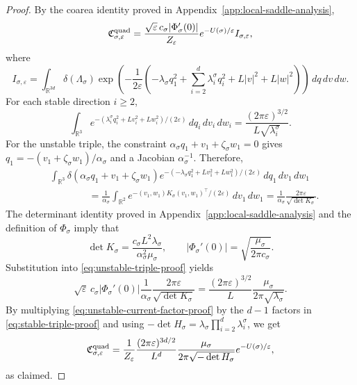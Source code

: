 \documentclass[11pt]{article}
\numberwithin{equation}{section}
\theoremstyle{plain}
\theoremstyle{definition}
\theoremstyle{remark}
\newcommand{\R}{\mathbb R}
\newcommand{\eps}{\varepsilon}
\begin{document}
\begin{proof}
By the coarea identity proved in Appendix~\ref{app:local-saddle-analysis},
\begin{equation}
\label{eq:quadratic-current-proof-factorization}
\mathfrak C_{\sigma,\eps}^{\rm quad}
=\frac{\sqrt\eps\,c_\sigma|\Phi_\sigma'(0)|}{Z_\eps}
e^{-U(\sigma)/\eps}I_{\sigma,\eps},
\end{equation}
where
\[
I_{\sigma,\eps}
=\int_{\R^{3d}}\delta(\Lambda_\sigma)
\exp\!\left(-\frac1{2\eps}\left(
-\lambda_\sigma q_1^2+\sum_{i=2}^d\lambda_i^\sigma q_i^2
+L|v|^2+L|w|^2\right)\right)\,dq\,dv\,dw.
\]
For each stable direction $i\ge2$,
\begin{equation}
\label{eq:stable-triple-proof}
\int_{\R^3}
e^{-(\lambda_i^\sigma q_i^2+Lv_i^2+Lw_i^2)/(2\eps)}
\,dq_i\,dv_i\,dw_i
=\frac{(2\pi\eps)^{3/2}}{L\sqrt{\lambda_i^\sigma}}.
\end{equation}
For the unstable triple, the constraint
$\alpha_\sigma q_1+v_1+\zeta_\sigma w_1=0$ gives
$q_1=-(v_1+\zeta_\sigma w_1)/\alpha_\sigma$ and a Jacobian
$\alpha_\sigma^{-1}$.  Therefore,
\begin{equation}
\label{eq:unstable-triple-proof}
\begin{aligned}
&\int_{\R^3}\delta(\alpha_\sigma q_1+v_1+\zeta_\sigma w_1)
e^{-(-\lambda_\sigma q_1^2+Lv_1^2+Lw_1^2)/(2\eps)}
\,dq_1\,dv_1\,dw_1 \\
&\hspace{4em}
=\frac1{\alpha_\sigma}
\int_{\R^2}e^{-(v_1,w_1)K_\sigma(v_1,w_1)^\top/(2\eps)}
\,dv_1\,dw_1
=\frac1{\alpha_\sigma}\frac{2\pi\eps}{\sqrt{\det K_\sigma}}.
\end{aligned}
\end{equation}
The determinant identity proved in Appendix~\ref{app:local-saddle-analysis} and the definition of
$\Phi_\sigma$ imply that
\[
\det K_\sigma
=\frac{c_\sigma L^2\lambda_\sigma}{\alpha_\sigma^2\mu_\sigma},
\qquad
|\Phi_\sigma'(0)|=\sqrt{\frac{\mu_\sigma}{2\pi c_\sigma}}.
\]
Substitution into \eqref{eq:unstable-triple-proof} yields
\begin{equation}
\label{eq:unstable-current-factor-proof}
\sqrt\eps\,c_\sigma|\Phi_\sigma'(0)|
\frac1{\alpha_\sigma}\frac{2\pi\eps}{\sqrt{\det K_\sigma}}
=\frac{(2\pi\eps)^{3/2}}{L}
\frac{\mu_\sigma}{2\pi\sqrt{\lambda_\sigma}}.
\end{equation}
By multiplying \eqref{eq:unstable-current-factor-proof} by the $d-1$ factors in
\eqref{eq:stable-triple-proof} and using
$-\det H_\sigma=\lambda_\sigma\prod_{i=2}^d\lambda_i^\sigma$, we get
\[
\mathfrak C_{\sigma,\eps}^{\rm quad}
=\frac1{Z_\eps}\frac{(2\pi\eps)^{3d/2}}{L^d}
\frac{\mu_\sigma}{2\pi\sqrt{-\det H_\sigma}}
e^{-U(\sigma)/\eps},
\]
as claimed.
\end{proof}
\end{document}
